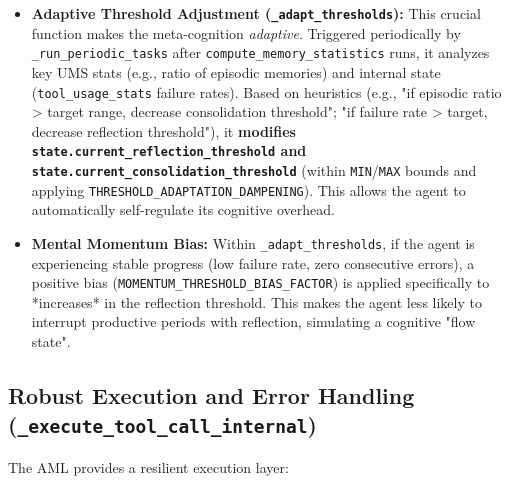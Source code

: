 \documentclass[12pt,a4paper]{article}
\newcommand{\code}[1]{\nolinkurl{#1}}
\begin{document}
\begin{itemize}
    \item \textbf{Adaptive Threshold Adjustment (\code{\_adapt\_thresholds}):} This crucial function makes the meta-cognition \textit{adaptive}. Triggered periodically by \code{\_run\_periodic\_tasks} after \code{compute\_memory\_statistics} runs, it analyzes key UMS stats (e.g., ratio of episodic memories) and internal state (\code{tool\_usage\_stats} failure rates). Based on heuristics (e.g., "if episodic ratio > target range, decrease consolidation threshold"; "if failure rate > target, decrease reflection threshold"), it \textbf{modifies \code{state.current\_reflection\_threshold} and \code{state.current\_consolidation\_threshold}} (within \code{MIN}/\code{MAX} bounds and applying \code{THRESHOLD\_ADAPTATION\_DAMPENING}). This allows the agent to automatically self-regulate its cognitive overhead.
    \item \textbf{Mental Momentum Bias:} Within \code{\_adapt\_thresholds}, if the agent is experiencing stable progress (low failure rate, zero consecutive errors), a positive bias (\code{MOMENTUM\_THRESHOLD\_BIAS\_FACTOR}) is applied specifically to *increases* in the reflection threshold. This makes the agent less likely to interrupt productive periods with reflection, simulating a cognitive "flow state".
\end{itemize}

\subsection{Robust Execution and Error Handling (\code{\_execute\_tool\_call\_internal})}

The AML provides a resilient execution layer:
\end{document}
